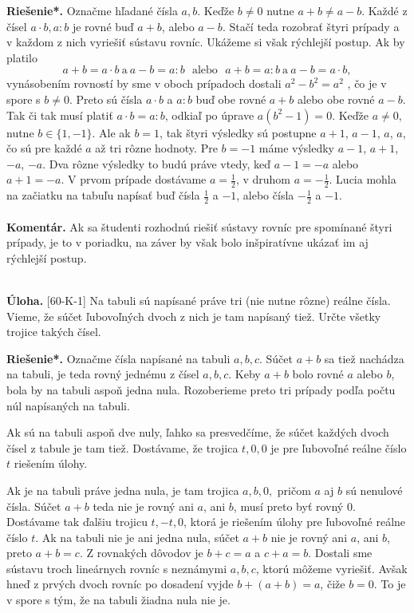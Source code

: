 \documentclass[11pt,a4paper,oneside,final]{book}
\newcommand{\kom}{\textbf{Komentár.} }
\newcommand{\ul}{\textbf{Úloha.} }
\newcommand{\rieh}{\textbf{Riešenie*.} }
\begin{document}
\rieh Označme hľadané čísla $a, b$. Keďže $b \neq 0$ nutne $a + b \neq a - b$. Každé z čísel $a \cdot b, a : b$ je rovné buď $a + b$, alebo $a - b$. Stačí teda rozobrať štyri prípady a v každom z nich vyriešiť sústavu rovníc. Ukážeme si však rýchlejší postup.
Ak by platilo
$$ a + b = a \cdot b \ \mathrm{a} \ a - b = a : b \ \ \  \mathrm{alebo} \ \ \  a + b = a : b \ \mathrm{a} \ a - b = a \cdot b,$$
vynásobením rovností by sme v oboch prípadoch dostali $a^2 - b^2 = a^2$ , čo je v spore s $b\neq 0$. Preto sú čísla $a \cdot b$ a $a : b$ buď obe rovné $a + b$ alebo obe rovné $a - b$. Tak či tak musí platiť $a \cdot b = a : b$, odkiaľ po úprave $a(b^2 - 1) = 0$. Keďže $a\neq 0$, nutne $b \in \{ 1, - 1 \}$. Ale ak $b = 1$, tak štyri výsledky sú postupne $a + 1$, $a - 1$, $a$, $a$, čo sú pre každé $a$ až tri rôzne hodnoty. Pre $b = - 1$ máme výsledky $a - 1$, $a + 1$, $- a$, $- a$. Dva rôzne výsledky to budú práve vtedy, keď $a - 1 = - a$ alebo $a + 1 = - a$. V prvom prípade dostávame $a =\frac{1}{2}$, v druhom $a = - \frac{1}{2}$.
Lucia mohla na začiatku na tabuľu napísať buď čísla $\frac{1}{2}$ a $- 1$, alebo čísla $-\frac{1}{2}$ a $- 1$.\\
\\
\kom Ak sa študenti rozhodnú riešiť sústavy rovníc pre spomínané štyri prípady, je to v poriadku, na záver by však bolo inšpiratívne ukázať im aj rýchlejší postup.\\
\\
\begin{tcolorbox}[breakable,notitle,boxrule=0pt,colback=light-gray,colframe=light-gray]\ul [60-K-1]
Na tabuli sú napísané práve tri (nie nutne rôzne) reálne čísla. Vieme, že súčet ľubovoľných dvoch z nich je tam napísaný tiež. Určte všetky trojice takých čísel.

\end{tcolorbox}

\rieh Označme čísla napísané na tabuli $a, b, c$. Súčet $a + b$ sa tiež nachádza na tabuli, je teda rovný jednému z čísel $a, b, c$. Keby $a + b$ bolo rovné $a$ alebo $b$, bola by na tabuli aspoň jedna nula. Rozoberieme preto tri prípady podľa počtu núl napísaných na tabuli.

Ak sú na tabuli aspoň dve nuly, ľahko sa presvedčíme, že súčet každých dvoch čísel z tabule je tam tiež. Dostávame, že trojica $t, 0, 0$ je pre ľubovoľné reálne číslo $t$ riešením úlohy.

Ak je na tabuli práve jedna nula, je tam trojica $a, b, 0,$ pričom $a$ aj $b$ sú nenulové čísla. Súčet $a + b$ teda nie je rovný ani $a$, ani $b$, musí preto byť rovný 0. Dostávame tak ďalšiu trojicu $t, -t, 0$, ktorá je riešením úlohy pre ľubovoľné reálne číslo $t$.
Ak na tabuli nie je ani jedna nula, súčet $a + b$ nie je rovný ani $a$, ani $b$, preto $a + b = c$. Z rovnakých dôvodov je $b + c = a$ a $c + a = b$. Dostali sme sústavu troch lineárnych rovníc s neznámymi $a, b, c$, ktorú môžeme vyriešiť. Avšak hneď z prvých dvoch rovníc po dosadení vyjde $b + (a + b) = a$, čiže $b = 0$. To je v spore s tým, že na tabuli žiadna nula nie je.
\end{document}
